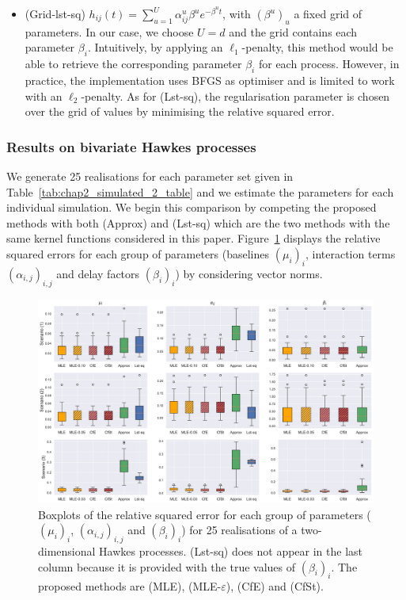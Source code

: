 \begin{enumerate}
\begin{itemize}
        \item (Grid-lst-sq) $h_{ij}(t) = \sum_{u=1}^{U}{\alpha_{ij}^u\beta^u e^{-\beta^u t}}$, with $(\beta^u)_u$ a fixed grid of parameters. In our case, we choose $U=d$ and the grid contains each parameter $\beta_{i}$. Intuitively, by applying an $\ell_1$-penalty, this method would be able to retrieve the corresponding parameter $\beta_{i}$ for each process.
        However, in practice, the implementation uses BFGS as optimiser and is limited to work with an $\ell_2$-penalty. As for (Lst-sq), the regularisation parameter is chosen over the grid of values by minimising the relative squared error.
    \end{itemize}
    \end{enumerate}


    \subsubsection{Results on bivariate Hawkes processes}\label{sec:chap2_dim2}

   We generate 25 realisations for each parameter set given in Table~\ref{tab:chap2_simulated_2_table} and we estimate the parameters for each individual simulation.  We begin this comparison by competing the proposed methods with both (Approx) and (Lst-sq) which are the two methods with the same kernel functions considered in this paper. Figure~\ref{fig:chap2_boxplots} displays the relative squared errors for each group of parameters (baselines $(\mu_i)_i$, interaction terms $(\alpha_{i,j})_{i,j}$ and delay factors $(\beta_i)_i$)  by considering vector norms.
    
    {\begin{figure}[!ht]
    \centering
    \includegraphics[width=0.9\linewidth]{images/chapter3/boxplots2O.pdf}
    \caption{Boxplots of the relative squared error for each group of parameters ($(\mu_i)_i$, $(\alpha_{i,j})_{i,j}$ and $(\beta_i)_i$) for 25 realisations of a two-dimensional Hawkes processes.
    (Lst-sq) does not appear in the last column because it is provided with the true values of \((\beta_i)_i\).
    The proposed methods are (MLE), (MLE-$\varepsilon$), (CfE) and (CfSt).}
    \label{fig:chap2_boxplots}
    \end{figure}}
    
